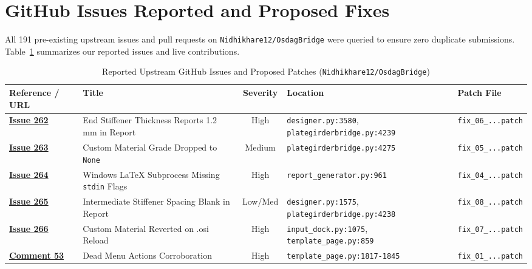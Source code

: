 \documentclass[11pt,a4paper]{article}
\begin{document}
\section{GitHub Issues Reported and Proposed Fixes}

All 191 pre-existing upstream issues and pull requests on \texttt{Nidhikhare12/OsdagBridge} were queried to ensure zero duplicate submissions. Table~\ref{tab:defects} summarizes our reported issues and live contributions.

\begin{table}[htbp]
\centering
\scriptsize
\caption{Reported Upstream GitHub Issues and Proposed Patches (\texttt{Nidhikhare12/OsdagBridge})}
\label{tab:defects}
\begin{tabularx}{\textwidth}{lp{3.0cm}cp{3.8cm}l}
\toprule
\textbf{Reference / URL} & \textbf{Title} & \textbf{Severity} & \textbf{Location} & \textbf{Patch File} \\
\midrule
\href{https://github.com/Nidhikhare12/OsdagBridge/issues/262}{\textbf{Issue 262}} & End Stiffener Thickness Reports 1.2 mm in Report & High & \texttt{designer.py:3580}, \texttt{plategirderbridge.py:4239} & \texttt{fix\_06\_...patch} \\
\href{https://github.com/Nidhikhare12/OsdagBridge/issues/263}{\textbf{Issue 263}} & Custom Material Grade Dropped to \texttt{None} & Medium & \texttt{plategirderbridge.py:4275} & \texttt{fix\_05\_...patch} \\
\href{https://github.com/Nidhikhare12/OsdagBridge/issues/264}{\textbf{Issue 264}} & Windows LaTeX Subprocess Missing \texttt{stdin} Flags & High & \texttt{report\_generator.py:961} & \texttt{fix\_04\_...patch} \\
\href{https://github.com/Nidhikhare12/OsdagBridge/issues/265}{\textbf{Issue 265}} & Intermediate Stiffener Spacing Blank in Report & Low/Med & \texttt{designer.py:1575}, \texttt{plategirderbridge.py:4238} & \texttt{fix\_08\_...patch} \\
\href{https://github.com/Nidhikhare12/OsdagBridge/issues/266}{\textbf{Issue 266}} & Custom Material Reverted on .osi Reload & High & \texttt{input\_dock.py:1075}, \texttt{template\_page.py:859} & \texttt{fix\_07\_...patch} \\
\href{https://github.com/Nidhikhare12/OsdagBridge/issues/53}{\textbf{Comment 53}} & Dead Menu Actions Corroboration & High & \texttt{template\_page.py:1817-1845} & \texttt{fix\_01\_...patch} \\
\bottomrule
\end{tabularx}
\end{table}
\end{document}
